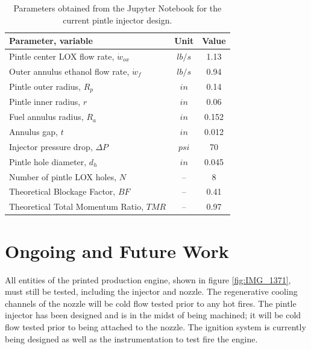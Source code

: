 \documentclass[]{aiaa-tc}%
\begin{document}
\begin{table}
\begin{center}
\begin{tabular}{| l | c | c |}
\hline
 Parameter, variable                          & Unit     & Value     \\
  \hline
  Pintle center LOX flow rate, $\dot w_{ox}$                                  & ${lb}/{s}$       & 1.13       \\
   Outer annulus ethanol flow rate, $\dot w_f$
   & ${lb}/{s}$       & 0.94       \\
 Pintle outer radius, $R_p$                              & $in$       & 0.14       \\
 Pintle inner radius, $r$          
 & $in$   & 0.06       \\
Fuel annulus radius, $R_a$          
 & $in$   & 0.152       \\
 Annulus gap, $t$          
 & $in$   & 0.012       \\
 Injector pressure drop, $\Delta P$          
 & $psi$   & 70       \\
  Pintle hole diameter, $d_h$          
 & $in$   & 0.045       \\
   Number of pintle LOX holes, $N$         
 & --   & 8       \\
  Theoretical Blockage Factor, $BF$          
 & --   & 0.41       \\
   Theoretical Total Momentum Ratio, $TMR$          
 & --   & 0.97       \\  
\hline
\end{tabular}
\end{center}
\caption{Parameters obtained from the Jupyter Notebook for the current pintle injector design.}
\label{tab:pintle}

\end{table}

\section{Ongoing and Future Work}
All entities of the printed production engine, shown in figure \ref{fig:IMG_1371}, must still be tested, including the injector and nozzle. The regenerative cooling channels of the nozzle will be cold flow tested prior to any hot fires. The pintle injector has been designed and is in the midst of being machined; it will be cold flow tested prior to being attached to the nozzle. The ignition system is currently being designed as well as the instrumentation to test fire the engine.%
\end{document}
